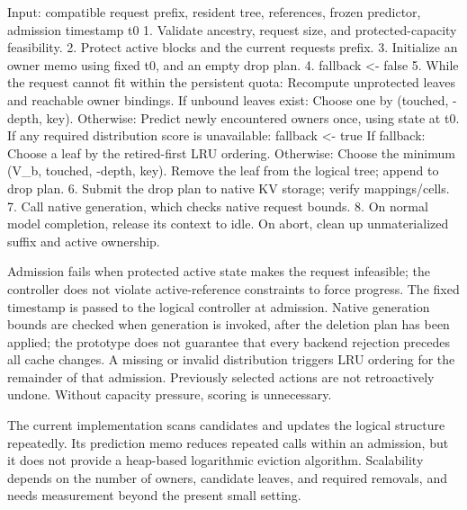\documentclass[sigconf, screen, review, balance=false]{acmart}
\newenvironment{Shaded}{}{}
\providecommand{\NormalTok}[1]{#1}
\begin{document}
\begin{Shaded}
\begin{Highlighting}[]
\NormalTok{Input: compatible request prefix, resident tree, references,}
\NormalTok{       frozen predictor, admission timestamp t0}
\NormalTok{1. Validate ancestry, request size, and protected{-}capacity feasibility.}
\NormalTok{2. Protect active blocks and the current request\textquotesingle{}s prefix.}
\NormalTok{3. Initialize an owner memo using fixed t0, and an empty drop plan.}
\NormalTok{4. fallback \textless{}{-} false}
\NormalTok{5. While the request cannot fit within the persistent quota:}
\NormalTok{     Recompute unprotected leaves and reachable owner bindings.}
\NormalTok{     If unbound leaves exist:}
\NormalTok{         Choose one by (touched, {-}depth, key).}
\NormalTok{     Otherwise:}
\NormalTok{         Predict newly encountered owners once, using state at t0.}
\NormalTok{         If any required distribution score is unavailable:}
\NormalTok{             fallback \textless{}{-} true}
\NormalTok{         If fallback:}
\NormalTok{             Choose a leaf by the retired{-}first LRU ordering.}
\NormalTok{         Otherwise:}
\NormalTok{             Choose the minimum (V\_b, touched, {-}depth, key).}
\NormalTok{     Remove the leaf from the logical tree; append to drop plan.}
\NormalTok{6. Submit the drop plan to native KV storage; verify mappings/cells.}
\NormalTok{7. Call native generation, which checks native request bounds.}
\NormalTok{8. On normal model completion, release its context to idle.}
\NormalTok{   On abort, clean up unmaterialized suffix and active ownership.}
\end{Highlighting}
\end{Shaded}

Admission fails when protected active state makes the request
infeasible; the controller does not violate active-reference constraints
to force progress. The fixed timestamp is passed to the logical
controller at admission. Native generation bounds are checked when
generation is invoked, after the deletion plan has been applied; the
prototype does not guarantee that every backend rejection precedes all
cache changes. A missing or invalid distribution triggers LRU ordering
for the remainder of that admission. Previously selected actions are not
retroactively undone. Without capacity pressure, scoring is unnecessary.

The current implementation scans candidates and updates the logical
structure repeatedly. Its prediction memo reduces repeated calls within
an admission, but it does not provide a heap-based logarithmic eviction
algorithm. Scalability depends on the number of owners, candidate
leaves, and required removals, and needs measurement beyond the present
small setting.
\end{document}
